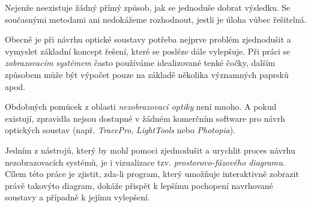 Nejenže neexistuje žádný přímý způsob, jak se jednoduše dobrat výsledku. Se současnými metodami ani nedokážeme rozhodnout, jestli je úloha vůbec řešitelná.\src

Obecně je při návrhu optické soustavy potřeba nejprve problém zjednodušit a vymyslet základní koncept řešení, které se posléze dále vylepšuje. Při práci se \emph{zobrazovacím systémem }často používáme idealizované tenké čočky, dalším způsobem může být výpočet pouze na základě několika významných paprsků apod.

Obdobných pomůcek z oblasti \emph{nezobrazovací optiky} není mnoho. A pokud existují, zpravidla nejsou dostupné v žádném komerčním software pro návrh optických soustav (např. \emph{TracePro}, \emph{LightTools} nebo \emph{Photopia}).\src

Jedním z nástrojů, který by mohl pomoci zjednodušit a urychlit proces návrhu nezobrazovacích systémů, je i vizualizace tzv. \emph{prostorovo-fázového diagramu}. Cílem této práce je zjistit, zda-li program, který umožňuje interaktivně zobrazit právě takovýto diagram, dokáže přispět k lepšímu pochopení navrhované soustavy a případně k jejímu vylepšení.
